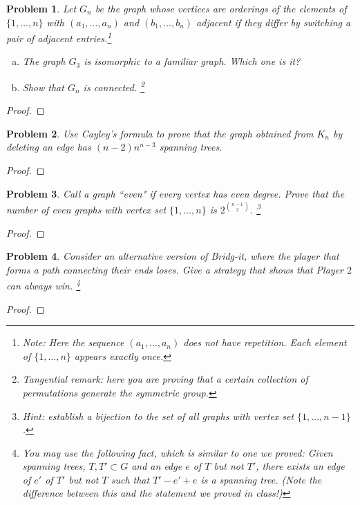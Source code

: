 \documentclass[11pt]{article}
\newtheorem{problem}{Problem}
\begin{document}
\begin{problem}
Let $G_n$ be the graph whose vertices are orderings of the elements of $\{1,\ldots,n\}$ with $(a_1,\ldots,a_n)$ and $(b_1,\ldots,b_n)$ adjacent if they differ by switching a pair of adjacent entries.\footnote{Note: Here the sequence $(a_1,\ldots,a_n)$ does not have repetition. Each element of $\{1,\ldots,n\}$ appears exactly once.}
\begin{enumerate}[(a)]
\item The graph $G_3$ is isomorphic to a familiar graph. Which one is it? 
\item Show that $G_n$ is connected. \footnote{Tangential remark: here you are proving that a certain collection of permutations generate the symmetric group.} 
\end{enumerate} 
\end{problem}

\begin{proof}

\end{proof}


\begin{problem}
Use Cayley's formula to prove that the graph obtained from $K_n$ by deleting an edge has $(n-2)n^{n-3}$ spanning trees. 
\end{problem}

\begin{proof}

\end{proof}

\begin{problem}
Call a graph ``even" if every vertex has even degree. Prove that the number of even graphs with vertex set $\{1,\ldots,n\}$ is $2^{{n-1\choose 2}}$. \footnote{Hint: establish a bijection to the set of all graphs with vertex set $\{1,\ldots,n-1\}$. }
\end{problem}


\begin{proof}

\end{proof}


\begin{problem}
Consider an alternative version of Bridg-it, where the player that forms a path connecting their ends loses. Give a strategy that shows that Player $2$ can always win. \footnote{You may use the following fact, which is similar to one we proved: Given spanning trees, $T,T'\subset G$ and an edge $e$ of $T$ but not $T'$, there exists an edge of $e'$ of $T'$ but not $T$ such that $T'-e'+e$ is a spanning tree. (Note the difference between this and the statement we proved in class!)}
\end{problem} 

\begin{proof}

\end{proof}
\end{document}

